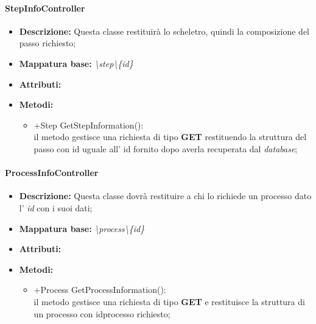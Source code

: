 \paragraph{StepInfoController}%
\begin{itemize}
	\item \textbf{Descrizione: }Questa classe restituirà lo scheletro, quindi la composizione del passo richiesto;
	\item \textbf{Mappatura base: }\textit{\textbackslash step\textbackslash \{id\}}
	\item \textbf{Attributi: }
	\item \textbf{Metodi: }\begin{itemize}
					\item +Step GetStepInformation():\\
					 il metodo gestisce una richiesta di tipo \textbf{GET} restituendo la struttura del passo con id uguale all' id fornito dopo averla recuperata dal \textit{database};
				\end{itemize}
\end{itemize}
\paragraph{ProcessInfoController}%
\begin{itemize}
	\item \textbf{Descrizione: } Questa classe dovrà restituire a chi lo richiede un processo dato l' \textit{id} con i suoi dati;
	\item \textbf{Mappatura base: }\textit{\textbackslash process\textbackslash \{id\}}
	\item \textbf{Attributi: }
	\item \textbf{Metodi: }\begin{itemize}
					\item +Process GetProcessInformation():\\
					il metodo gestisce una richiesta di tipo \textbf{GET} e restituisce la struttura di un processo con idprocesso richiesto;
				\end{itemize}
\end{itemize}